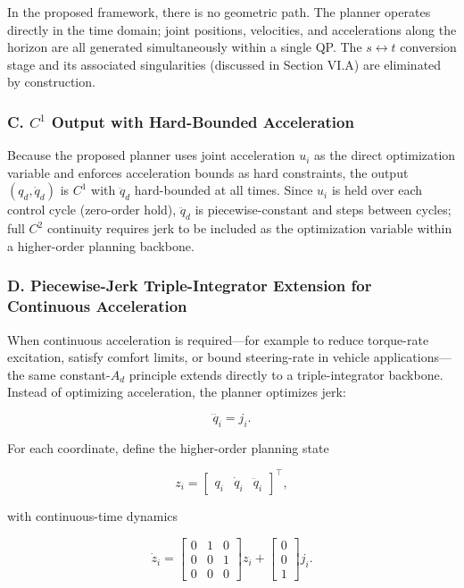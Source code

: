 In the proposed framework, there is no geometric path. The planner
operates directly in the time domain; joint positions, velocities, and
accelerations along the horizon are all generated simultaneously within
a single QP. The \(s \leftrightarrow t\) conversion stage and its
associated singularities (discussed in Section VI.A) are eliminated by
construction.

\subsubsection{\texorpdfstring{C. \(C^1\) Output with Hard-Bounded
Acceleration}{C. C\^{}1 Output with Hard-Bounded Acceleration}}\label{c.-c1-output-with-hard-bounded-acceleration}

Because the proposed planner uses joint acceleration \(u_i\) as the
direct optimization variable and enforces acceleration bounds as hard
constraints, the output \((q_d, \dot{q}_d)\) is \(C^1\) with
\(\ddot{q}_d\) hard-bounded at all times. Since \(u_i\) is held over
each control cycle (zero-order hold), \(\ddot{q}_d\) is
piecewise-constant and steps between cycles; full \(C^2\) continuity
requires jerk to be included as the optimization variable within a
higher-order planning backbone.

\subsubsection{D. Piecewise-Jerk Triple-Integrator Extension for
Continuous
Acceleration}\label{d.-piecewise-jerk-triple-integrator-extension-for-continuous-acceleration}

When continuous acceleration is required---for example to reduce
torque-rate excitation, satisfy comfort limits, or bound steering-rate
in vehicle applications---the same constant-\(A_d\) principle extends
directly to a triple-integrator backbone. Instead of optimizing
acceleration, the planner optimizes jerk:

\[\dddot q_i = j_i.\]

For each coordinate, define the higher-order planning state

\[z_i=\begin{bmatrix}q_i & \dot q_i & \ddot q_i\end{bmatrix}^\top,\]

with continuous-time dynamics

\[
\dot z_i =
\begin{bmatrix}
0&1&0\\
0&0&1\\
0&0&0
\end{bmatrix} z_i+
\begin{bmatrix}0\\0\\1\end{bmatrix}j_i .
\]

